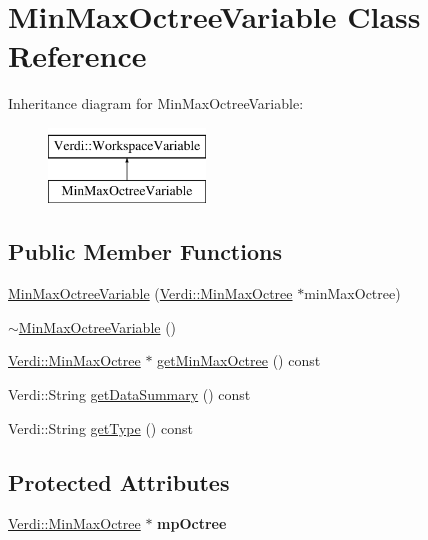 \hypertarget{class_min_max_octree_variable}{\section{\-Min\-Max\-Octree\-Variable \-Class \-Reference}
\label{class_min_max_octree_variable}
}
\-Inheritance diagram for \-Min\-Max\-Octree\-Variable\-:\begin{figure}[H]
\begin{center}
\leavevmode
\includegraphics[height=2.000000cm]{class_min_max_octree_variable}
\end{center}
\end{figure}
\subsection*{\-Public \-Member \-Functions}
\begin{DoxyCompactItemize}
\item 
\hyperlink{class_min_max_octree_variable_a3915d5074ec7dfed767c2ffda823f9be}{\-Min\-Max\-Octree\-Variable} (\hyperlink{class_verdi_1_1_min_max_octree}{\-Verdi\-::\-Min\-Max\-Octree} $\ast$min\-Max\-Octree)
\item 
\hyperlink{class_min_max_octree_variable_ac01fe2dc1245caed48e1392246a48d34}{$\sim$\-Min\-Max\-Octree\-Variable} ()
\item 
\hyperlink{class_verdi_1_1_min_max_octree}{\-Verdi\-::\-Min\-Max\-Octree} $\ast$ \hyperlink{class_min_max_octree_variable_a437917746c49e4e6db6ed2112cff72fe}{get\-Min\-Max\-Octree} () const 
\item 
\-Verdi\-::\-String \hyperlink{class_min_max_octree_variable_ac6eed0d269c5cfa5bceb019eea032739}{get\-Data\-Summary} () const 
\item 
\-Verdi\-::\-String \hyperlink{class_min_max_octree_variable_a3fbecef98496a9ed970e17dc999dbef9}{get\-Type} () const 
\end{DoxyCompactItemize}
\subsection*{\-Protected \-Attributes}
\begin{DoxyCompactItemize}
\item 
\hypertarget{class_min_max_octree_variable_a8bf9c7a22deef682b0fc14a6d4969561}{\hyperlink{class_verdi_1_1_min_max_octree}{\-Verdi\-::\-Min\-Max\-Octree} $\ast$ {\bfseries mp\-Octree}}\label{class_min_max_octree_variable_a8bf9c7a22deef682b0fc14a6d4969561}

\end{DoxyCompactItemize}


